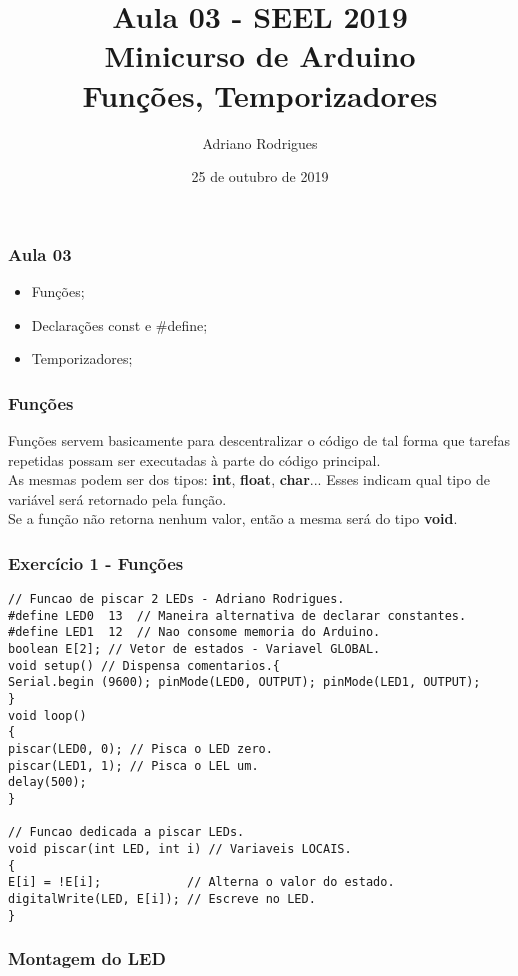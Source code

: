 \documentclass{beamer}
\title[Funções, Temporizadores e Sensor IR]{Aula 03 - SEEL 2019 \\Minicurso de Arduino \\Funções, Temporizadores}
\author[Adriano]{Adriano Rodrigues}
\date{25 de outubro de 2019}
\begin{document}
\begin{frame}
	\titlepage
\end{frame}

\begin{frame}
\frametitle{Aula 03}
	\begin{itemize}
		\item Funções;
		\item Declarações const e  \#define;
		\item Temporizadores;
	\end{itemize}
\end{frame}

\begin{frame}
	\frametitle{Funç\~oes}
	Funç\~oes servem basicamente para descentralizar o c\'odigo de tal forma que tarefas repetidas possam ser executadas \`a parte do c\'odigo principal.\\[5pt]
	As mesmas podem ser dos tipos: \textbf{int}, \textbf{float}, \textbf{char}... Esses indicam qual tipo de vari\'avel ser\'a retornado pela funç\~ao.\\[5pt]
	Se a função não retorna nenhum valor, então a mesma será do tipo \textbf{void}.
\end{frame}

\begin{frame}[fragile]
	\frametitle{Exercício 1 - Funções}
	\begin{lstlisting}[style=Arduino,basicstyle=\scriptsize \ttfamily]
// Funcao de piscar 2 LEDs - Adriano Rodrigues.
#define LED0  13  // Maneira alternativa de declarar constantes.
#define LED1  12  // Nao consome memoria do Arduino.
boolean E[2]; // Vetor de estados - Variavel GLOBAL.
void setup() // Dispensa comentarios.{
Serial.begin (9600); pinMode(LED0, OUTPUT); pinMode(LED1, OUTPUT);
}
void loop()
{
piscar(LED0, 0); // Pisca o LED zero.
piscar(LED1, 1); // Pisca o LEL um.
delay(500);
}

// Funcao dedicada a piscar LEDs.
void piscar(int LED, int i) // Variaveis LOCAIS.
{
E[i] = !E[i];            // Alterna o valor do estado.
digitalWrite(LED, E[i]); // Escreve no LED.
}
\end{lstlisting}
\end{frame}

\begin{frame}
	\frametitle{Montagem do LED}
	\begin{center}
	\end{center}
\end{frame}
\end{document}
